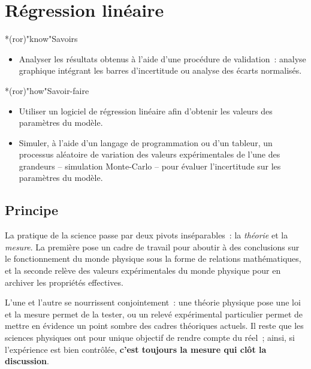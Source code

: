 \documentclass[a4paper, 12pt, garamond]{book}
\begin{document}
\setcounter{chapter}{3}

\chapter{Régression linéaire}

\vfill

\begin{prgm}
	\begin{tcb}*(ror)"know"{Savoirs}
		\begin{itemize}[label=$\diamond$, leftmargin=10pt]
			\item Analyser les résultats obtenus à l'aide d'une procédure de
			      validation~: analyse graphique intégrant les barres d'incertitude ou
			      analyse des écarts normalisés.
		\end{itemize}
	\end{tcb}

	\begin{tcb}*(ror)"how"{Savoir-faire}
		\begin{itemize}[label=$\diamond$, leftmargin=10pt]
			\item Utiliser un logiciel de régression linéaire afin d'obtenir les
			      valeurs des paramètres du modèle.

			\item Simuler, à l'aide d'un langage de programmation ou d'un tableur, un
            processus aléatoire de variation des valeurs expérimentales de l'une
            des grandeurs – simulation Monte-Carlo – pour évaluer l'incertitude
            sur les paramètres du modèle.
		\end{itemize}
	\end{tcb}
\end{prgm}

\vfill
\minitoc
\vfill

\newpage

\section{Principe}

La pratique de la science passe par deux pivots inséparables~: la
\textit{théorie} et la \textit{mesure}. La première pose un cadre de travail
pour aboutir à des conclusions sur le fonctionnement du monde physique sous la
forme de relations mathématiques, et la seconde relève des valeurs
expérimentales du monde physique pour en archiver les propriétés effectives.

L'une et l'autre se nourrissent conjointement~: une théorie physique pose une
loi et la mesure permet de la tester, ou un relevé expérimental particulier
permet de mettre en évidence un point sombre des cadres théoriques actuels. Il
reste que les sciences physiques ont pour unique objectif de rendre compte du
réel~; ainsi, si l'expérience est bien contrôlée, \textbf{c'est toujours la
	mesure qui clôt la discussion}.
\end{document}
